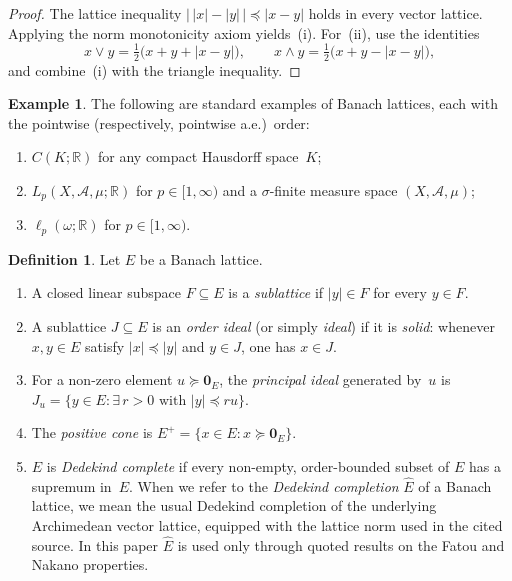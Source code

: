 \documentclass[12pt]{amsart}
\theoremstyle{plain}
\theoremstyle{definition}
\newtheorem{definition}[theorem]{Definition}
\newtheorem{example}[theorem]{Example}
\theoremstyle{remark}
\newcommand{\R}{\mathbb{R}}
\begin{document}
\begin{proof}
The lattice inequality
$\bigl\lvert\, \lvert x \rvert - \lvert y \rvert \,\bigr\rvert
\preceq \lvert x - y \rvert$ holds in every vector lattice.
Applying the norm monotonicity axiom yields~(i).  For~(ii), use the identities
\[
    x \vee y = \tfrac{1}{2}\bigl(x + y + \lvert x - y \rvert\bigr), \qquad
    x \wedge y = \tfrac{1}{2}\bigl(x + y - \lvert x - y \rvert\bigr),
\]
and combine~(i) with the triangle inequality.
\end{proof}

\begin{example}\label{ex:classical-lattices}
The following are standard examples of Banach lattices, each with the pointwise
(respectively, pointwise a.e.)\ order:
\begin{enumerate}[label=(\alph*)]
    \item $C(K; \R)$ for any compact Hausdorff space~$K$;
    \item $L_p(X, \mathcal{A}, \mu; \R)$ for $p \in [1, \infty)$ and a
      $\sigma$-finite measure space $(X, \mathcal{A}, \mu)$;
    \item $\ell_p(\omega; \R)$ for $p \in [1, \infty)$.
\end{enumerate}
\end{example}

\begin{definition}\label{def:sublattice-ideal}
Let $E$ be a Banach lattice.
\begin{enumerate}[label=(\roman*)]
    \item A closed linear subspace $F \subseteq E$ is a \emph{sublattice} if
      $\lvert y \rvert \in F$ for every $y \in F$.
    \item A sublattice $J \subseteq E$ is an \emph{order ideal} (or simply
      \emph{ideal}) if it is \emph{solid}: whenever $x, y \in E$ satisfy
      $\lvert x \rvert \preceq \lvert y \rvert$ and $y \in J$, one has $x \in J$.
    \item For a non-zero element $u \succeq \mathbf{0}_E$, the \emph{principal
      ideal} generated by~$u$ is
      $J_u = \{y \in E \colon \exists\, r > 0 \text{ with }
      \lvert y \rvert \preceq r u\}$.
    \item The \emph{positive cone} is
      $E^+ = \{x \in E \colon x \succeq \mathbf{0}_E\}$.
    \item $E$ is \emph{Dedekind complete} if every non-empty, order-bounded
      subset of $E$ has a supremum in~$E$.  When we refer to the
      \emph{Dedekind completion} $\hat E$ of a Banach lattice, we mean the
      usual Dedekind completion of the underlying Archimedean vector lattice,
      equipped with the lattice norm used in the cited source.  In this paper
      $\hat E$ is used only through quoted results on the Fatou and Nakano
      properties.
\end{enumerate}
\end{definition}
\end{document}
